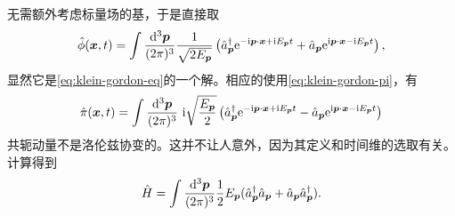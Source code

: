 \documentclass[hyperref, UTF8, a4paper]{ctexart}
\newcommand*{\ii}{\mathrm{i}}
\newcommand*{\ee}{\mathrm{e}}
\begin{document}
无需额外考虑标量场的基，于是直接取
\begin{equation}
    \hat{\phi}(\vb*{x}, t) = \int \frac{\dd[3]{\vb*{p}}}{(2\pi)^3} \frac{1}{\sqrt{2 E_{\vb*{p}}}} \left( \hat{a}^\dagger_{\vb*{p}} \ee^{ - \ii \vb*{p} \cdot \vb*{x} + \ii E_{\vb*{p}} t} + \hat{a}_{\vb*{p}} \ee^{ \ii \vb*{p} \cdot \vb*{x} - \ii E_{\vb*{p}} t} \right),
    \label{eq:expanding-klein-gordon-field}
\end{equation}
显然它是\eqref{eq:klein-gordon-eq}的一个解。相应的使用\eqref{eq:klein-gordon-pi}，有
\begin{equation}
    \hat{\pi}(\vb*{x}, t) = \int \frac{\dd[3]{\vb*{p}}}{(2\pi)^3} \  \ii \sqrt{\frac{E_{\vb*{p}}}{2}} \left( \hat{a}^\dagger_{\vb*{p}} \ee^{ - \ii \vb*{p} \cdot \vb*{x} + \ii E_{\vb*{p}} t} - \hat{a}_{\vb*{p}} \ee^{ \ii \vb*{p} \cdot \vb*{x} - \ii E_{\vb*{p}} t} \right)
\end{equation}
共轭动量不是洛伦兹协变的。这并不让人意外，因为其定义和时间维的选取有关。
计算得到
\[
    \hat{H} = \int \frac{\dd[3]{\vb*{p}}}{(2\pi)^3} \frac{1}{2} E_{\vb*{p}} (\hat{a}_{\vb*{p}}^\dagger \hat{a}_{\vb*{p}} + \hat{a}_{\vb*{p}} \hat{a}^\dagger_{\vb*{p}}).
\]
\end{document}
